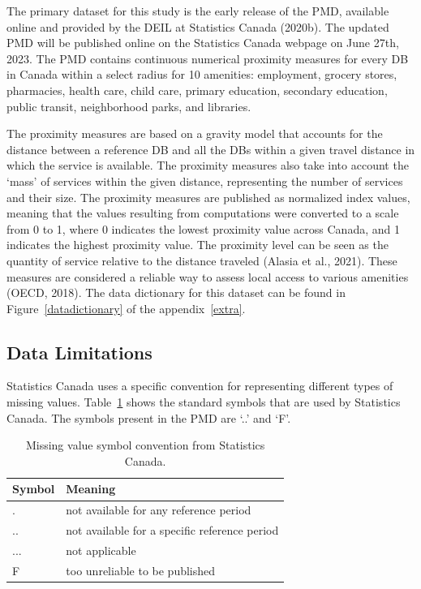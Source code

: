 \documentclass[11pt, a4paper]{article}
\begin{document}
The primary dataset for this study is the early release of the PMD, available online and provided by the DEIL at Statistics Canada (2020b). The updated PMD will be published online on the Statistics Canada webpage on June 27th, 2023. The PMD contains continuous numerical proximity measures for every DB in Canada within a select radius for 10 amenities: employment, grocery stores, pharmacies, health care, child care, primary education, secondary education, public transit, neighborhood parks, and libraries.
\par
The proximity measures are based on a gravity model that accounts for the distance between a reference DB and all the DBs within a given travel distance in which the service is available. The proximity measures also take into account the `mass' of services within the given distance, representing the number of services and their size. The proximity measures are published as normalized index values, meaning that the values resulting from computations were converted to a scale from 0 to 1, where 0 indicates the lowest proximity value across Canada, and 1 indicates the highest proximity value. The proximity level can be seen as the quantity of service relative to the distance traveled (Alasia et al., 2021). These measures are considered a reliable way to assess local access to various amenities (OECD, 2018). The data dictionary for this dataset can be found in Figure~\ref{datadictionary} of the appendix~\ref{extra}.







\subsection{Data Limitations}


Statistics Canada uses a specific convention for representing different types of missing values. Table~\ref{missingvalues} shows the standard symbols that are used by Statistics Canada. The symbols present in the PMD are `..' and `F'.





\begin{table}[H]
\centering
\caption[Missing value symbols]{Missing value symbol convention from Statistics Canada.}\label{missingvalues}
\begin{tabular}{|l|l|}
\hline
\textbf{Symbol} & \textbf{Meaning} \\
\hline
. & not available for any reference period \\
\hline
.. & not available for a specific reference period \\
\hline
... & not applicable \\
\hline
F & too unreliable to be published \\
\hline
\end{tabular}
\end{table}
\end{document}
